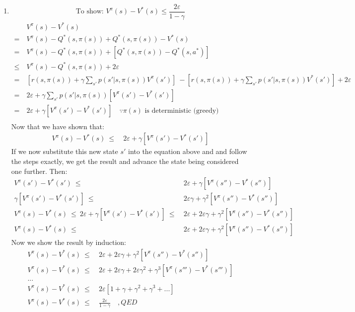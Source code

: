 \documentclass[11pt]{article}
\let\epsilon\varepsilon
\begin{document}
\begin{enumerate}[label=(\alph*)]
	\item
	$$\textrm{To show: } V^\pi(s) - V^*(s) \leq \frac{2\epsilon}{1-\gamma}$$
	\begin{align*}
	&\ V^\pi(s) - V^*(s) \\
	=&\ V^\pi(s) - Q^*(s,\pi(s)) + Q^*(s,\pi(s)) - V^*(s) \\
	=&\ V^\pi(s) - Q^*(s,\pi(s)) + [Q^*(s,\pi(s)) - Q^*(s, a^*)] \\
	\leq& \ V^\pi(s) - Q^*(s,\pi(s)) + 2\epsilon \\ 
	=&\ [r(s,\pi(s)) + \gamma \sum_{s'}p(s'|s,\pi(s))V^\pi(s')] \ - [r(s,\pi(s)) + \gamma \sum_{s'}p(s'|s,\pi(s))V^*(s')] + 2\epsilon \\
	=&\ 2\epsilon + \gamma\sum_{s'}p(s'|s,\pi(s))[V^\pi(s') - V^*(s')] \\
	=&\ 2\epsilon + \gamma[V^\pi(s') - V^*(s')] \quad \because \textrm{$\pi(s)$ is deterministic (greedy)} \\
	\end{align*}
	Now that we have shown that:
	\begin{align*}
	V^\pi(s) - V^*(s) \ \leq& \ 2\epsilon + \gamma[V^\pi(s') - V^*(s')]
	\end{align*}
	If we now substitute this new state $s'$ into the equation above and and follow the steps exactly, we get the result and advance the state being considered one further. Then:
	\begin{align*}
	V^\pi(s') - V^*(s') \ \leq& \ 2\epsilon + \gamma[V^\pi(s'') - V^*(s'')] \\
	\gamma[V^\pi(s') - V^*(s')] \ \leq& \ 2\epsilon\gamma + \gamma^2[V^\pi(s'') - V^*(s'')] \\
	V^\pi(s) - V^*(s) \ \leq \ 2\epsilon+\gamma[V^\pi(s') - V^*(s')] \ \leq& \ 2\epsilon + 2\epsilon\gamma + \gamma^2[V^\pi(s'') - V^*(s'')] \\
	V^\pi(s) - V^*(s) \ \leq& \ 2\epsilon + 2\epsilon\gamma + \gamma^2[V^\pi(s'') - V^*(s'')]
	\end{align*}
	Now we show the result by induction:
	\begin{align*}
	V^\pi(s) - V^*(s) \ \leq& \ 2\epsilon + 2\epsilon\gamma + \gamma^2[V^\pi(s'') - V^*(s'')] \\
	V^\pi(s) - V^*(s) \ \leq& \ 2\epsilon + 2\epsilon\gamma + 2\epsilon\gamma^2 + \gamma^3[V^\pi(s''') - V^*(s''')] \\
	... \\
	V^\pi(s) - V^*(s) \ \leq& \ 2\epsilon[1+\gamma+\gamma^2+\gamma^3+...] \\ 
	V^\pi(s) - V^*(s) \ \leq& \ \frac{2\epsilon}{1-\gamma} \quad, QED \\ 
	\end{align*}
	

\end{enumerate}
\end{document}
